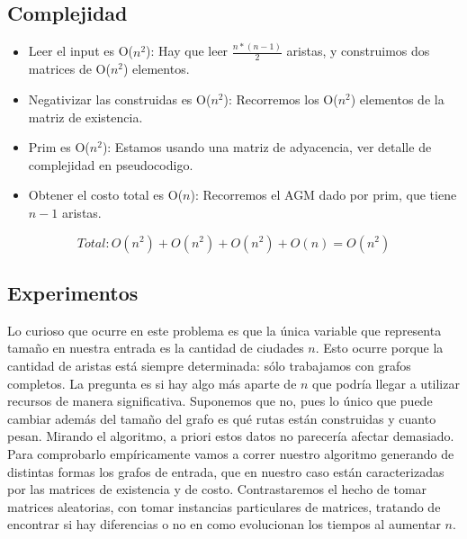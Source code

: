 \subsection{Complejidad}

\begin{itemize}
	\item Leer el input es O($n^2$): Hay que leer $\frac{n*(n-1)}{2}$ aristas, y construimos dos matrices de O($n^2$) elementos.
	\item Negativizar las construidas es O($n^2$): Recorremos los O($n^2$) elementos de la matriz de existencia.
	\item Prim es O($n^2$): Estamos usando una matriz de adyacencia, ver detalle de complejidad en pseudocodigo.
	\item Obtener el costo total es O($n$): Recorremos el AGM dado por prim, que tiene $n-1$ aristas.
\end{itemize}

$$Total:  O(n^2) + O(n^2) + O(n^2) + O(n) = O(n^2) $$

\subsection{Experimentos}

Lo curioso que ocurre en este problema es que la única variable que representa tamaño en nuestra entrada es la cantidad de ciudades $n$. Esto ocurre porque la cantidad de aristas está siempre determinada: sólo trabajamos con grafos completos. La pregunta es si hay algo más aparte de $n$ que podría llegar a utilizar recursos de manera significativa. Suponemos que no, pues lo único que puede cambiar además del tamaño del grafo es qué rutas están construidas y cuanto pesan. Mirando el algoritmo, a priori estos datos no parecería afectar demasiado. \\

Para comprobarlo empíricamente vamos a correr nuestro algoritmo generando de distintas formas los grafos de entrada, que en nuestro caso están caracterizadas por las matrices de existencia y de costo. Contrastaremos el hecho de tomar matrices aleatorias, con tomar instancias particulares de matrices, tratando de encontrar si hay diferencias o no en como evolucionan los tiempos al aumentar $n$. \\


